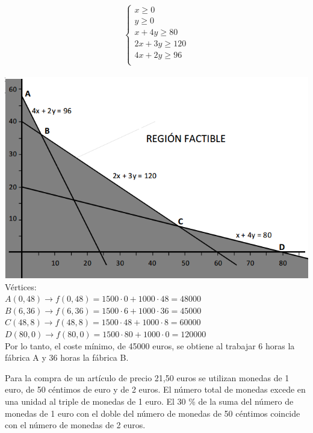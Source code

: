 \documentclass[addpoints,spanish, 12pt,a4paper]{exam}
\begin{document}
\begin{questions}
\begin{parts}
\end{parts}
\begin{solution}
$$\left\{\begin{matrix}
x  \geqslant  0\\
y  \geqslant  0\\
x + 4y  \geqslant  80\\
2x + 3y  \geqslant  120\\
4x + 2y  \geqslant  96 \\
\end{matrix}\right.$$ 
\\
\includegraphics[scale=0.5]{re1_1} 
\\Vértices:\\
$A(0 , 48) \to f( 0 , 48)= 1500 \cdot 0 +  1000 \cdot 48 = 48000$\\
$B( 6,36) \to f( 6,36)=1500 \cdot 6 +  1000 \cdot 36 =  45000$\\
$C(48,8) \to f(48,8)=1500 \cdot 48 +  1000 \cdot 8 = 60000$\\
$D( 80 , 0) \to f( 80 , 0)=1500 \cdot 80 +  1000 \cdot 0 = 120000$\\

Por lo tanto, el coste mínimo, de 45000 euros, se obtiene al trabajar 6 horas la fábrica A y 36 horas la fábrica B.
\end{solution}

\question Para la compra de un artículo de precio 21,50 euros se utilizan monedas de 1 euro, de 50 céntimos de euro y
de 2 euros. El número total de monedas excede en una unidad al triple de monedas de 1 euro. El 30
\% de la suma del número de monedas de 1 euro con el doble del número de monedas de 50 céntimos coincide
con el número de monedas de 2 euros.
\begin{parts}

\end{parts}
\end{questions}
\end{document}
